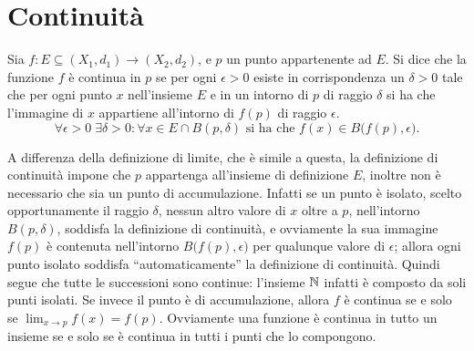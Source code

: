 \section{Continuità}
\begin{definizione} \label{d:continuita}
Sia $f\colon E\subseteq (X_1,d_1)\to(X_2,d_2)$, e $p$ un punto appartenente ad $E$. Si dice che la funzione $f$ è continua in $p$ se per ogni $\epsilon>0$ esiste in corrispondenza un $\delta>0$ tale che per ogni punto $x$ nell'insieme $E$ e in un intorno di $p$ di raggio $\delta$ si ha che l'immagine di $x$ appartiene all'intorno di $f(p)$ di raggio $\epsilon$.
\begin{equation} \label{eq:def-cont}
\forall\epsilon>0\;\exists\delta>0\colon\forall x\in E\cap B(p,\delta)\text{ si ha che } f(x)\in B\big(f(p),\epsilon\big).
\end{equation}
\end{definizione}
A differenza della definizione di limite, che è simile a questa, la definizione di continuità impone che $p$ appartenga all'insieme di definizione $E$, inoltre non è necessario che sia un punto di accumulazione.
Infatti se un punto è isolato, scelto opportunamente il raggio $\delta$, nessun altro valore di $x$ oltre a $p$, nell'intorno $B(p,\delta)$, soddisfa la definizione di continuità, e ovviamente la sua immagine $f(p)$ è contenuta nell'intorno $B\big(f(p),\epsilon\big)$ per qualunque valore di $\epsilon$; allora ogni punto isolato soddisfa ``automaticamente'' la definizione di continuità. Quindi segue che tutte le successioni sono continue: l'insieme $\mathbb{N}$ infatti è composto da soli punti isolati.
Se invece il punto è di accumulazione, allora $f$ è continua se e solo se $\lim_{x\to p} f(x)=f(p)$.
Ovviamente una funzione è continua in tutto un insieme se e solo se è continua in tutti i punti che lo compongono.


